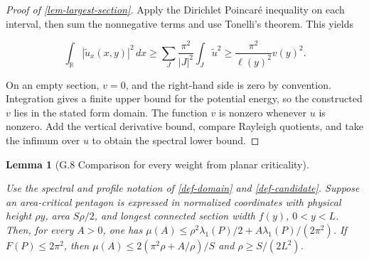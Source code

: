 \documentclass[11pt,a4paper]{article}
\theoremstyle{proofmanuscript}
\newtheorem{lemma}[theorem]{Lemma}
\begin{document}
\begin{proof}[Proof of \ref{lem-largest-section}]
Apply the Dirichlet Poincaré inequality on each interval, then sum the nonnegative terms and use Tonelli's theorem. This yields

\[
\int_\mathbb R |\widetilde u_x(x,y)|^2\,dx
\ge\sum_J\frac{\pi^2}{|J|^2}\int_J\widetilde u^2
\ge\frac{\pi^2}{\ell(y)^2}v(y)^2.
\]

On an empty section, \(v=0\), and the right-hand side is zero by convention. Integration gives a finite upper bound for the potential energy, so the constructed \(v\) lies in the stated form domain. The function \(v\) is nonzero whenever \(u\) is nonzero. Add the vertical derivative bound, compare Rayleigh quotients, and take the infimum over \(u\) to obtain the spectral lower bound.

\end{proof}

\begin{lemma}[G.8 Comparison for every weight from planar criticality]\label{lem-weighted-section}

Use the spectral and profile notation of \ref{def-domain} and \ref{def-candidate}. Suppose an area-critical pentagon is expressed in normalized coordinates with physical height \(\rho y\), area \(S\rho/2\), and longest connected section width \(f(y)\), \(0<y<L\). Then, for every \(A>0\), one has \(\mu(A)\le\rho^2\lambda_1(P)/2+A\lambda_1(P)/(2\pi^2)\). If \(F(P)\le2\pi^2\), then \(\mu(A)\le2(\pi^2\rho+A/\rho)/S\) and \(\rho\ge S/(2L^2)\).

\end{lemma}
\end{document}
